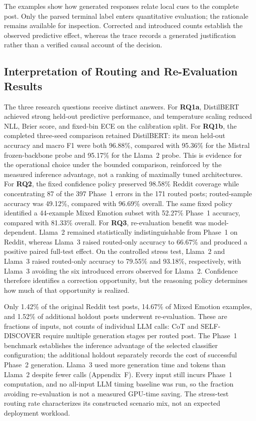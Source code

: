 \documentclass{ieeeaccess}
\begin{document}
The examples show how generated responses relate local cues to the complete post. Only the parsed terminal label enters quantitative evaluation; the rationale remains available for inspection. Corrected and introduced counts establish the observed predictive effect, whereas the trace records a generated justification rather than a verified causal account of the decision.

\subsection{Interpretation of Routing and Re-Evaluation Results}

The three research questions receive distinct answers. For \textbf{RQ1a}, DistilBERT achieved strong held-out predictive performance, and temperature scaling reduced NLL, Brier score, and fixed-bin ECE on the calibration split. For \textbf{RQ1b}, the completed three-seed comparison retained DistilBERT: its mean held-out accuracy and macro F1 were both 96.88\%, compared with 95.36\% for the Mistral frozen-backbone probe and 95.17\% for the Llama~2 probe. This is evidence for the operational choice under the bounded comparison, reinforced by the measured inference advantage, not a ranking of maximally tuned architectures. For \textbf{RQ2}, the fixed confidence policy preserved 98.58\% Reddit coverage while concentrating 87 of the 397 Phase~1 errors in the 171 routed posts; routed-sample accuracy was 49.12\%, compared with 96.69\% overall. The same fixed policy identified a 44-example Mixed Emotion subset with 52.27\% Phase~1 accuracy, compared with 81.33\% overall. For \textbf{RQ3}, re-evaluation benefit was model-dependent. Llama~2 remained statistically indistinguishable from Phase~1 on Reddit, whereas Llama~3 raised routed-only accuracy to 66.67\% and produced a positive paired full-test effect. On the controlled stress test, Llama~2 and Llama~3 raised routed-only accuracy to 79.55\% and 93.18\%, respectively, with Llama~3 avoiding the six introduced errors observed for Llama~2. Confidence therefore identifies a correction opportunity, but the reasoning policy determines how much of that opportunity is realized.

Only 1.42\% of the original Reddit test posts, 14.67\% of Mixed Emotion examples, and 1.52\% of additional holdout posts underwent re-evaluation. These are fractions of inputs, not counts of individual LLM calls: CoT and SELF-DISCOVER require multiple generation stages per routed post. The Phase~1 benchmark establishes the inference advantage of the selected classifier configuration; the additional holdout separately records the cost of successful Phase~2 generation. Llama~3 used more generation time and tokens than Llama~2 despite fewer calls (Appendix~F). Every input still incurs Phase~1 computation, and no all-input LLM timing baseline was run, so the fraction avoiding re-evaluation is not a measured GPU-time saving. The stress-test routing rate characterizes its constructed scenario mix, not an expected deployment workload.
\end{document}
